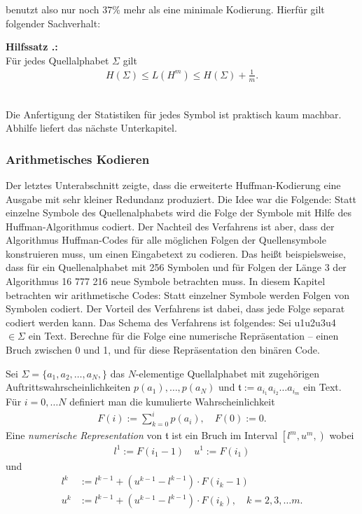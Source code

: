 \documentclass[a4paper,12pt]{article}
\newcounter{Hilfssatz}
\newcounter{Algorithmus}
\newenvironment{Hilfssatz}{
\medskip
        
        \setlength{\parindent}{0pt}
        \addtocounter{Hilfssatz}{1}
        \textbf{\textsf{Hilfssatz \thesubsection.\theHilfssatz}:}\\}{
        \nopagebreak
        \vspace{-1.0ex}
        \bigskip\\
}
\begin{document}
benutzt also nur noch $37\%$ mehr als eine minimale Kodierung.
Hierfür gilt folgender Sachverhalt:
\begin{Hilfssatz}
Für jedes Quellalphabet $\Sigma$ gilt
\begin{align*}
H(\Sigma)\leq L(H^m) \leq H(\Sigma) + \frac{1}{m}.
\end{align*}
\end{Hilfssatz}
Die Anfertigung der Statistiken für jedes Symbol ist praktisch kaum machbar. Abhilfe liefert das nächste Unterkapitel.
\subsubsection{Arithmetisches Kodieren}
Der letztes Unterabschnitt zeigte, dass die erweiterte Huffman-Kodierung eine Ausgabe mit sehr kleiner Redundanz produziert. Die Idee war die Folgende: Statt einzelne Symbole des Quellenalphabets wird die Folge der Symbole mit Hilfe des Huffman-Algorithmus codiert. Der Nachteil des Verfahrens ist aber, dass der Algorithmus Huffman-Codes für alle möglichen Folgen der Quellensymbole konstruieren muss, um einen Eingabetext zu codieren. Das heißt beispielsweise, dass für ein Quellenalphabet mit 256 Symbolen und für Folgen der Länge 3 der Algorithmus 16 777 216 neue Symbole betrachten muss. In diesem Kapitel betrachten wir  arithmetische Codes: Statt einzelner Symbole werden Folgen von Symbolen codiert. Der Vorteil des Verfahrens ist dabei, dass jede Folge separat codiert werden kann. Das Schema des Verfahrens ist folgendes: Sei u1u2u3u4 $\in\Sigma$ ein Text. Berechne für die Folge eine numerische Repräsentation – einen Bruch zwischen 0 und 1, und für diese Repräsentation den binären Code. 
\par
Sei $\Sigma = \{a_{1},a_{2},\ldots,a_{N},\}$ das $N$-elementige Quellalphabet mit zugehörigen Auftrittswahrscheinlichkeiten $p(a_1),\ldots , p(a_N)$ und $\mathfrak{t}:=a_{i_1}a_{i_2}\ldots a_{i_m}$ ein Text. Für $i=0,\ldots N$ definiert man die kumulierte Wahrscheinlichkeit
\begin{align*}
F(i):=\sum_{k=0}^{i}p(a_i),\quad F(0):=0.
\end{align*}
Eine {\it numerische Representation} von $\mathfrak{t}$ ist ein Bruch im Interval $\left.\left[l^{m} ,  u^{m},\right.\right)$ wobei
\begin{align*}
l^{1}:=F(i_1 -1)\quad u^1:=F(i_1)
\end{align*}
und
\begin{align*}
l^{k}&:=l^{k-1} + \left( u^{k-1} - l^{k-1}\right) \cdot F(i_{k} - 1)
\\
u^{k}&:=l^{k-1} + \left( u^{k-1} - l^{k-1}\right) \cdot F(i_{k}),\quad k=2,3,\ldots m.
\end{align*}
\end{document}
